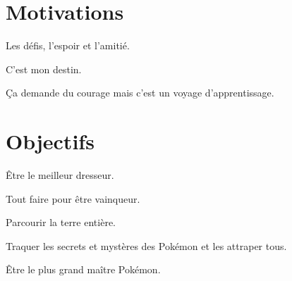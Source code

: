 \documentclass[12pt, twoside, openright]{report}
\begin{document}
\leavevmode\thispagestyle{empty}\newpage


\section*{Motivations}

Les défis, l'espoir et l'amitié.

C'est mon destin.

Ça demande du courage mais c'est un voyage d'apprentissage.

\section*{Objectifs}

Être le meilleur dresseur.

Tout faire pour être vainqueur.

Parcourir la terre entière.

Traquer les secrets et mystères des Pokémon et les attraper tous.

Être le plus grand maître Pokémon.

\leavevmode\thispagestyle{empty}\newpage
















\end{document}
